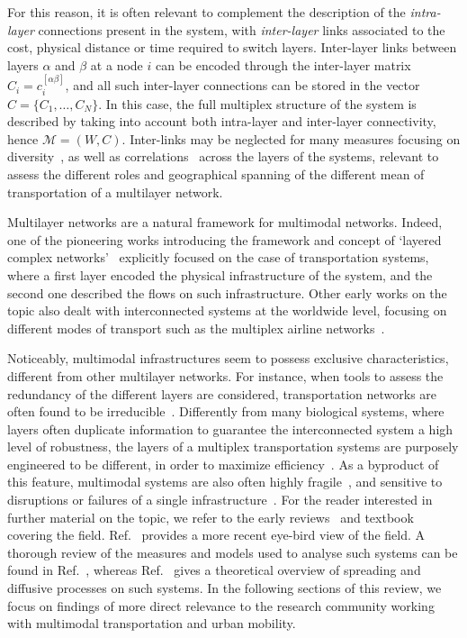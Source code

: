 For this reason, it is often relevant to complement the description of the \textit{intra-layer} connections present in the system, with \textit{inter-layer} links associated to the cost, physical distance or time required to switch layers. Inter-layer links between layers $\alpha$ and $\beta$ at a node $i$ can be encoded through the inter-layer matrix $C_i=c_i^{[\alpha \beta]}$, and all such inter-layer connections can be stored in the vector $ C = \{C_1, \ldots, C_N\}$. In this case, the full multiplex structure of the system is described by taking into account both intra-layer and inter-layer connectivity, hence $\mathcal M = (W,  C)$. Inter-links may be neglected for many measures focusing on diversity~\cite{battiston2014structural}, as well as correlations~\cite{nicosia2015measuring} across the layers of the systems, relevant to assess the different roles and geographical spanning of the different mean of transportation of a multilayer network. 

Multilayer networks are a natural framework for multimodal networks. Indeed, one of the pioneering works introducing the framework and concept of `layered complex networks'~\cite{kurant2006layered} explicitly focused on the case of transportation systems, where a first layer encoded the physical infrastructure of the system, and the second one described the flows on such infrastructure. Other early works on the topic also dealt with interconnected systems at the worldwide level, focusing on different modes of transport such as the multiplex airline networks~\cite{cardillo2013emergence}.

Noticeably, multimodal infrastructures seem to possess exclusive characteristics, different from other multilayer networks. For instance, when tools to assess the redundancy of the different layers are considered, transportation networks are often found to be irreducible~\cite{dedomenico2015structural}. Differently from many biological systems, where layers often duplicate information to guarantee the interconnected system a high level of robustness, the layers of a multiplex transportation systems are purposely engineered to be different, in order to maximize efficiency~\cite{latora2001efficient}. As a byproduct of this feature, multimodal systems are also often highly fragile~\cite{buldyrev2010catastrophic}, and sensitive to disruptions or failures of a single infrastructure~\cite{dedomenico2014interconnected}. For the reader interested in further material on the topic, we refer to the early reviews~\cite{boccaletti2014structure, kivela2014multilayer} and textbook~\cite{bianconi2018multilayer} covering the field. Ref.~\cite{aleta2019multilayer} provides a more recent eye-bird view of the field. A thorough review of the measures and models used to analyse such systems can be found in Ref.~\cite{battiston2017new}, whereas Ref.~\cite{dedomenico2016physics} gives a theoretical overview of spreading and diffusive processes on such systems. In the following sections of this review, we focus on findings of more direct relevance to the research community working with multimodal transportation and urban mobility. 


